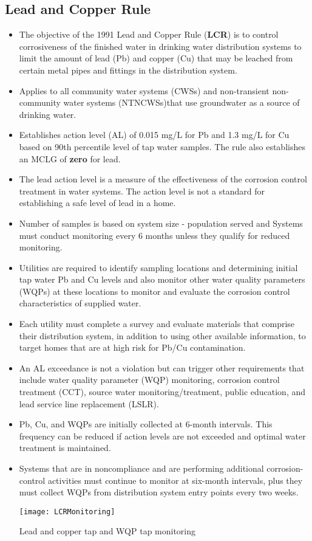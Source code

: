 \subsection{Lead and Copper Rule}
\begin{itemize}
\item The objective of the 1991 Lead and Copper Rule (\textbf{LCR}) is to control corrosiveness of the finished water in drinking water distribution systems to limit the amount of lead (Pb) and copper (Cu) that may be leached from certain metal pipes and fittings in the distribution system.
\item Applies to all community water systems (CWSs) and non-transient non-community water systems (NTNCWSs)that use groundwater as a source of drinking water.
\item Establishes action level (AL) of 0.015 mg/L for Pb and 1.3 mg/L for Cu based on 90th percentile level of tap water samples.  The rule also establishes an MCLG of \textbf{zero} for lead.
\item The lead action level is a measure of the effectiveness of the corrosion control treatment
in water systems. The action level is not a standard for establishing a safe level of lead in a
home. 
\item Number of samples is based on system size - population served and Systems must conduct monitoring every 6 months unless they qualify for reduced monitoring. 
\item Utilities are required to identify sampling locations and determining initial tap water Pb and Cu levels and also monitor other water quality parameters (WQPs) at these locations to monitor and evaluate the corrosion control characteristics of supplied water.
\item Each utility must complete a survey and evaluate materials that comprise their distribution system, in addition to using other available information, to target homes that are at high risk for Pb/Cu contamination.
\item An AL exceedance is not a violation but can trigger other requirements that include water quality parameter (WQP) monitoring, corrosion control treatment (CCT), source water monitoring/treatment, public education, and lead service line replacement (LSLR).
\item Pb, Cu, and WQPs are initially collected at 6-month intervals.  This frequency can be reduced if action levels are not exceeded and optimal water treatment is maintained.
\item Systems that are in noncompliance and are performing additional corrosion-control activities must continue to monitor at six-month intervals, plus they must collect WQPs from distribution system entry points every two weeks.
\begin{table}[H]
\begin{center}
\texttt{[image: LCRMonitoring]}
\caption{Lead and copper tap and WQP tap monitoring}
\end{center}
\end{table}
\end{itemize}

